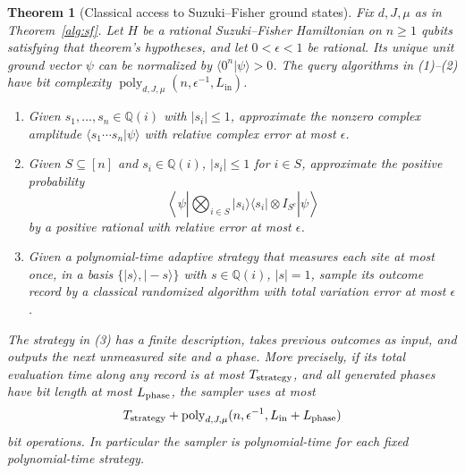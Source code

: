 \documentclass[reqno]{amsart}
\newtheorem{theorem}{Theorem}[section]
\theoremstyle{definition}
\theoremstyle{remark}
\begin{document}
\begin{theorem}[Classical access to Suzuki--Fisher ground states]
\label{alg:sf-state}
Fix \(d,J,\mu\) as in Theorem~\ref{alg:sf}.
Let \(H\) be a rational Suzuki--Fisher Hamiltonian on \(n\ge1\)
qubits satisfying that theorem's hypotheses, and let
\(0<\epsilon<1\) be rational.
Its unique unit ground vector \(\psi\) can be normalized by
\(\langle0^n|\psi\rangle>0\).  The query algorithms in (1)--(2)
have bit complexity
\(\operatorname{poly}_{d,J,\mu}(n,\epsilon^{-1},L_{\mathrm{in}})\).
\begin{enumerate}
\item Given \(s_1,\ldots,s_n\in\mathbb Q(i)\) with
      \(|s_i|\le1\), approximate the nonzero complex amplitude
      \(\langle s_1\cdots s_n|\psi\rangle\) with relative
      complex error at most \(\epsilon\).
\item Given \(S\subseteq[n]\) and \(s_i\in\mathbb Q(i)\),
      \(|s_i|\le1\) for \(i\in S\), approximate the positive
      probability
      \[
      \left\langle\psi\left|
        \bigotimes_{i\in S}|s_i\rangle\langle s_i|
                \otimes I_{S^c}\right|\psi\right\rangle
      \]
      by a positive rational with relative error at most
      \(\epsilon\).
\item Given a polynomial-time adaptive strategy that measures
      each site at most once, in a basis
      \(\{|s\rangle,|-s\rangle\}\) with
      \(s\in\mathbb Q(i)\), \(|s|=1\), sample its outcome
      record by a classical randomized algorithm with total
      variation error at most \(\epsilon\).
\end{enumerate}
The strategy in (3) has a finite description, takes previous
outcomes as input, and outputs the next unmeasured site and a
phase.  More precisely, if its total evaluation time along
any record is at most \(T_{\rm strategy}\), and all generated
phases have bit length at most \(L_{\rm phase}\), the sampler
uses at most
\[
 T_{\rm strategy}+
 \operatorname{poly}_{d,J,\mu}
       (n,\epsilon^{-1},L_{\rm in}+L_{\rm phase})
\]
bit operations.  In particular the sampler is polynomial-time
for each fixed polynomial-time strategy.
\end{theorem}
\end{document}
